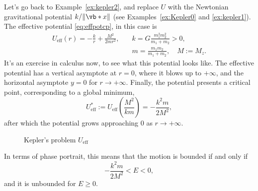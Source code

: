 \documentclass[english,fontsize=11pt,paper=b5]{scrbook}
\numberwithin{equation}{chapter}
\theoremstyle{definition}
\begin{document}
    Let's go back to Example~\ref{ex:kepler2}, and replace $U$ with the Newtonian gravitational potential $k/\|\vb*{x}\|$ (see Examples~\ref{ex:Kepler0} and \ref{ex:kepler1}).
    The effective potential \eqref{eq:effpotcp}, in this case is
    \begin{align}
      U_{\mathrm{eff}} (r) = -\frac kr + \frac {M^2}{2 m r^2}, \quad & k = G \frac{m_1^2 m_2^2}{m_1+m_2} > 0,      \\
                                                                     & m = \frac{m_1m_2}{m_1+m_2}, \quad M := M_z.
    \end{align}
    It's an exercise in calculus now, to see what this potential looks like.
    The effective potential has a vertical asymptote at $r=0$, where it blows up to $+\infty$,
    and the horizontal asymptote $y=0$ for $r\to+\infty$.
    Finally, the potential presents a critical point, corresponding to a global minimum,
    \begin{equation}
      U_{\mathrm{eff}}^* := U_{\mathrm{eff}}\left(\frac{M^2}{k m}\right) = - \frac{k^2m}{2M^2},
    \end{equation}
    after which the potential grows approaching $0$ as $r\to+\infty$.

    \begin{figure}[th]
      \centering
      \label{fig:KeplerVeff}
      \caption{Kepler's problem $U_{\mathrm{eff}}$}
    \end{figure}
    In terms of phase portrait, this means that the motion is bounded if and only if
    \begin{equation}
      - \frac{k^2 m}{2 M^2} < E < 0,
    \end{equation}
    and it is unbounded for $E \geq 0$.
\end{document}

